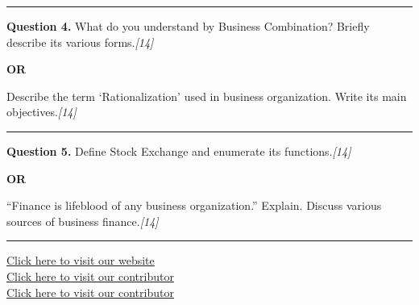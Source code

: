 \documentclass[11pt,a4paper]{article}
\newcommand{\pts}[1]{\hfill   \textit{[#1]}}
\begin{document}
\medskip\rule{\linewidth}{0.2pt}




\noindent   \textbf{Question 4.}
What do you understand by Business Combination? Briefly describe its various forms.\pts{14}

\centerline{   \textbf{OR}}

Describe the term `Rationalization' used in business organization. Write its main objectives.\pts{14}

\medskip\rule{\linewidth}{0.2pt}




\noindent   \textbf{Question 5.}
Define Stock Exchange and enumerate its functions.\pts{14}

\centerline{   \textbf{OR}}

``Finance is lifeblood of any business organization.'' Explain. Discuss various sources of business finance.\pts{14}

\vfill
\rule{\linewidth}{0.4pt}

\begin{center}\small
\href{https://bhu-exam.vercel.app/}{Click here to visit our website}\\[4pt]
\href{https://me-aryan.vercel.app/}{Click here to visit our contributor}\\[4pt]
\href{https://quashan-me.vercel.app/}{Click here to visit our contributor}
\end{center}
\end{document}
